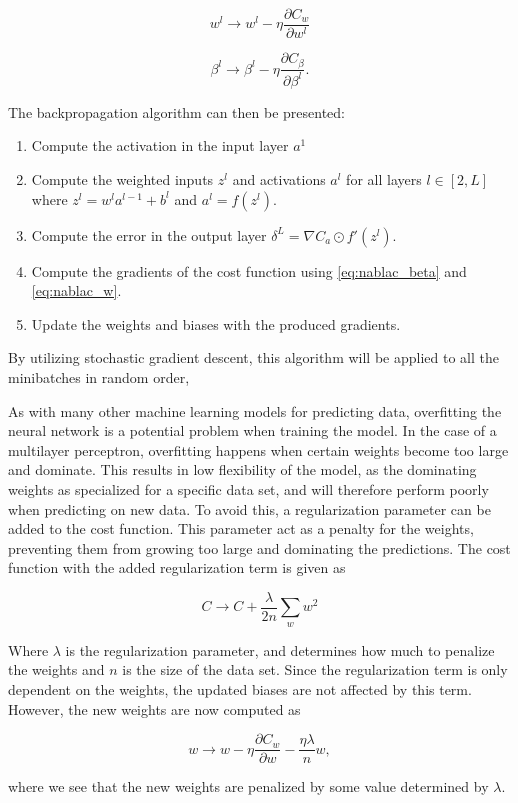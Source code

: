 \documentclass[a4paper,10pt,english]{article}
\begin{document}
$$w^l \rightarrow w^l - \eta \frac{\partial C_{w}}{\partial w^l}$$

$$\beta^l \rightarrow \beta^l - \eta \frac{\partial C_{\beta}}{\partial \beta^l}.$$

The backpropagation algorithm can then be presented:

\begin{enumerate}
    \item Compute the activation in the input layer $a^1$
    \item Compute the weighted inputs $z^l$ and activations $a^l$ for all layers $l \in [2, L]$ where $z^l = w^l a^{l-1} + b^l$ and $a^l = f(z^l).$
    \item Compute the error in the output layer $\delta^L = \nabla C_a \odot f'(z^l).$
    \item Compute the gradients of the cost function using \ref{eq:nablac_beta} and \ref{eq:nablac_w}.
    \item Update the weights and biases with the produced gradients.
\end{enumerate}

By utilizing stochastic gradient descent, this algorithm will be applied to all the minibatches in random order, 

As with many other machine learning models for predicting data, overfitting the neural network is a potential problem when training the model. In the case of a multilayer perceptron, overfitting happens when certain weights become too large and dominate. This results in low flexibility of the model, as the dominating weights as specialized for a specific data set, and will therefore perform poorly when predicting on new data. To avoid this, a regularization parameter can be added to the cost function. This parameter act as a penalty for the weights, preventing them from growing too large and dominating the predictions. The cost function with the added regularization term is given as

$$C \rightarrow C + \frac{\lambda}{2n}\sum_w w^2$$

Where $\lambda$ is the regularization parameter, and determines how much to penalize the weights and $n$ is the size of the data set. Since the regularization term is only dependent on the weights, the updated biases are not affected by this term. However, the new weights are now computed as

$$w \rightarrow w - \eta\frac{\partial C_w}{\partial w} - \frac{\eta \lambda}{n} w,$$

where we see that the new weights are penalized by some value determined by $\lambda$.
\end{document}
